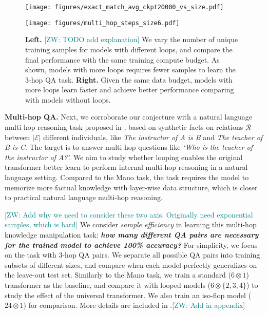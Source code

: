 \documentclass[]{bytedance_seed}
\newcommand{\1}{\mathbf{1}}
\newcommand{\zixuan}[1]{\textcolor{teal}{[ZW: #1]}}
\begin{document}
\begin{figure}[t]
\centering
\vspace{-5pt}
\setlength{\tabcolsep}{6pt}
\begin{minipage}[t]{0.48\textwidth}
\small
\centering
\texttt{[image: figures/exact\_match\_avg\_ckpt20000\_vs\_size.pdf]}
\end{minipage}
\hfill
\begin{minipage}[t]{0.48\textwidth}
\centering
\texttt{[image: figures/multi\_hop\_steps\_size6.pdf]}
\end{minipage}
\caption{\textbf{Left.} \zixuan{TODO add explanation} We vary the number of unique training samples for models with different loops, and compare the final performance with the same training compute budget. As shown, models with more loops requires fewer samples to learn the 3-hop QA task.
\textbf{Right.} Given the same data budget, models with more loops learn faster and achieve better performance comparing with models without loops.}
\label{fig:multi_hop}
\vspace{-5pt}
\end{figure}

\textbf{Multi-hop QA. } Next, we corroborate our conjecture with a natural language multi-hop reasoning task proposed in \cite{yao2025language}, based on synthetic facts on relations $\mathcal{R}$ between $|\mathcal{E}|$ different individuals, like \textit{The instructor of A is B} and \textit{The teacher of B is C}. The target is to answer multi-hop questions like \textit{`Who is the teacher of the instructor of A?'.} We aim to study whether looping enables the original transformer better learn to perform internal multi-hop reasoning in a natural language setting. Compared to the Mano task, the task requires the model to memorize more factual knowledge with layer-wise data structure, which is closer to practical natural language multi-hop reasoning.

\zixuan{Add why we need to consider these two axis. Originally need exponential samples, which is hard}
We consider \textit{sample efficiency} in learning this multi-hop knowledge manipulation task: \textit{\textbf{how many different QA pairs are necessary for the trained model to achieve 100\% accuracy?}} For simplicity, we focus on the task with 3-hop QA pairs. We separate all possible QA pairs into training subsets of different sizes, and compare when each model perfectly generalizes on the leave-out test set.
Similarly to the Mano task, we train a standard ($6\otimes1$) transformer as the baseline, and compare it with looped models ($6\otimes \{2,3,4\}$) to study the effect of the universal transformer. We also train an iso-flop model ($24\otimes 1$) for comparison. More details are included in .\zixuan{Add in appendix} 
\end{document}
